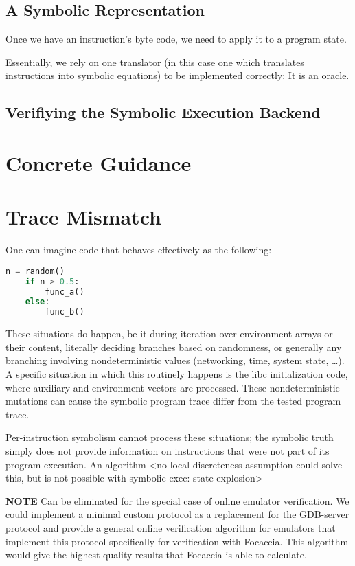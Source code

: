 \subsection{A Symbolic Representation}

Once we have an instruction's byte code, we need to apply it to a program state.

Essentially, we rely on one translator (in this case one which translates instructions into symbolic equations) to be
implemented correctly: It is an oracle.

\subsection{Verifiying the Symbolic Execution Backend}

\section{Concrete Guidance}\label{sec:impl:concrete_exec}

\section{Trace Mismatch}\label{sec:impl:trace_mismatch}

One can imagine code that behaves effectively as the following:

\begin{lstlisting}[language=Python]
    n = random()
    if n > 0.5:
        func_a()
    else:
        func_b()
\end{lstlisting}

These situations do happen, be it during iteration over environment arrays or their content, literally deciding branches
based on randomness, or generally any branching involving nondeterministic values (networking, time, system state, …). A
specific situation in which this routinely happens is the libc initialization code, where auxiliary and environment
vectors are processed. These nondeterministic mutations can cause the symbolic program trace differ from the tested
program trace.

Per-instruction symbolism cannot process these situations; the symbolic truth simply does not provide information on
instructions that were not part of its program execution. An algorithm <no local discreteness assumption could solve
this, but is not possible with symbolic exec: state explosion>

\textbf{NOTE} Can be eliminated for the special case of online emulator verification. We could implement a minimal
custom protocol as a replacement for the GDB-server protocol and provide a general online verification algorithm for
emulators that implement this protocol specifically for verification with Focaccia. This algorithm would give the
highest-quality results that Focaccia is able to calculate.



%
%
%
